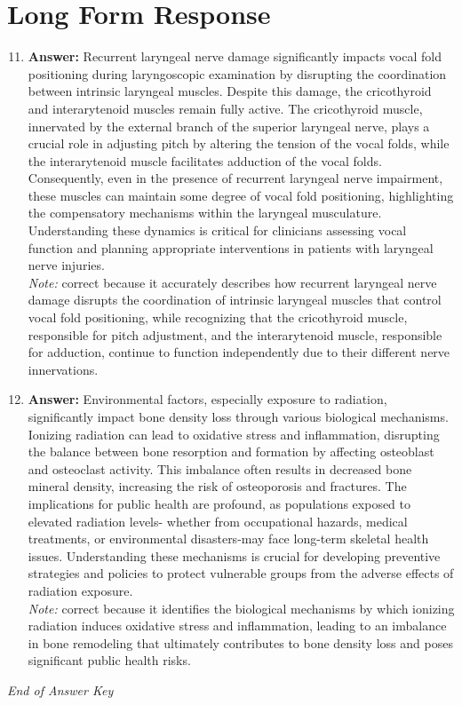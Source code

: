 \documentclass[12pt]{article}
\begin{document}
\section*{Long Form Response}
\begin{enumerate}[label=\arabic*.]
\setcounter{enumi}{10}
\item \textbf{Answer:} Recurrent laryngeal nerve damage significantly impacts vocal fold positioning during laryngoscopic examination by disrupting the coordination between intrinsic laryngeal muscles. Despite this damage, the cricothyroid and interarytenoid muscles remain fully active. The cricothyroid muscle, innervated by the external branch of the superior laryngeal nerve, plays a crucial role in adjusting pitch by altering the tension of the vocal folds, while the interarytenoid muscle facilitates adduction of the vocal folds. Consequently, even in the presence of recurrent laryngeal nerve impairment, these muscles can maintain some degree of vocal fold positioning, highlighting the compensatory mechanisms within the laryngeal musculature. Understanding these dynamics is critical for clinicians assessing vocal function and planning appropriate interventions in patients with laryngeal nerve injuries.
\\ \textit{Note:} correct because it accurately describes how recurrent laryngeal nerve damage disrupts the coordination of intrinsic laryngeal muscles that control vocal fold positioning, while recognizing that the cricothyroid muscle, responsible for pitch adjustment, and the interarytenoid muscle, responsible for adduction, continue to function independently due to their different nerve innervations.
\item \textbf{Answer:} Environmental factors, especially exposure to radiation, significantly impact bone density loss through various biological mechanisms. Ionizing radiation can lead to oxidative stress and inflammation, disrupting the balance between bone resorption and formation by affecting osteoblast and osteoclast activity. This imbalance often results in decreased bone mineral density, increasing the risk of osteoporosis and fractures. The implications for public health are profound, as populations exposed to elevated radiation levels- whether from occupational hazards, medical treatments, or environmental disasters-may face long-term skeletal health issues. Understanding these mechanisms is crucial for developing preventive strategies and policies to protect vulnerable groups from the adverse effects of radiation exposure.
\\ \textit{Note:} correct because it identifies the biological mechanisms by which ionizing radiation induces oxidative stress and inflammation, leading to an imbalance in bone remodeling that ultimately contributes to bone density loss and poses significant public health risks.
\end{enumerate}

\vfill
\noindent\textit{End of Answer Key}
\end{document}
